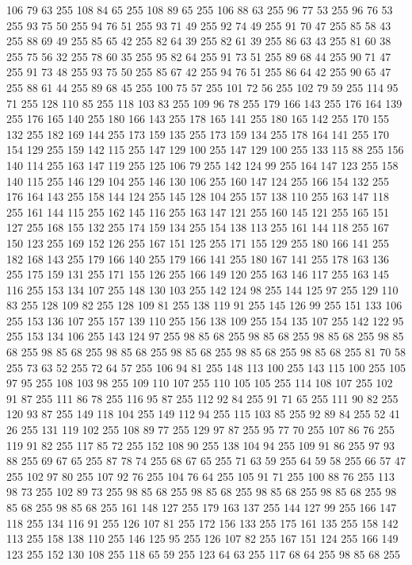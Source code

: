 106 79 63 255 108 84 65 255 108 89 65 255 106 88 63 255 96 77 53 255 96 76 53 255 93 75 50 255 94 76 51 255 93 71 49 255 92 74 49 255 91 70 47 255 85 58 43 255 88 69 49 255 85 65 42 255 82 64 39 255 82 61 39 255 86 63 43 255 81 60 38 255 75 56 32 255 78 60 35 255 95 82 64 255 91 73 51 255 89 68 44 255 90 71 47 255 91 73 48 255 93 75 50 255 85 67 42 255 94 76 51 255 86 64 42 255 90 65 47 255 88 61 44 255 89 68 45 255 100 75 57 255 101 72 56 255 102 79 59 255 114 95 71 255 128 110 85 255 118 103 83 255 109 96 78 255 179 166 143 255 176 164 139 255 176 165 140 255 180 166 143 255 178 165 141 255 180 165 142 255 170 155 132 255 182 169 144 255 173 159 135 255 173 159 134 255 178 164 141 255 170 154 129 255 159 142 115 255 147 129 100 255 147 129 100 255 133 115 88 255 156 140 114 255 163 147 119 255 125 106 79 255 142 124 99 255 164 147 123 255 158 140 115 255 146 129 104 255 146 130 106 255 160 147 124 255
166 154 132 255 176 164 143 255 158 144 124 255 145 128 104 255 157 138 110 255 163 147 118 255 161 144 115 255 162 145 116 255 163 147 121 255 160 145 121 255 165 151 127 255 168 155 132 255 174 159 134 255 154 138 113 255 161 144 118 255 167 150 123 255 169 152 126 255 167 151 125 255 171 155 129 255 180 166 141 255 182 168 143 255 179 166 140 255 179 166 141 255 180 167 141 255 178 163 136 255 175 159 131 255 171 155 126 255 166 149 120 255 163 146 117 255 163 145 116 255 153 134 107 255 148 130 103 255 142 124 98 255 144 125 97 255 129 110 83 255 128 109 82 255 128 109 81 255 138 119 91 255 145 126 99 255 151 133 106 255 153 136 107 255 157 139 110 255 156 138 109 255 154 135 107 255 142 122 95 255 153 134 106 255 143 124 97 255 98 85 68 255 98 85 68 255 98 85 68 255 98 85 68 255 98 85 68 255 98 85 68 255 98 85 68 255 98 85 68 255 98 85 68 255 81 70 58 255 73 63 52 255 72 64 57 255 106 94 81 255 148 113 100 255 143 115 100 255 105 97 95 255 108 103 98 255
109 110 107 255 110 105 105 255 114 108 107 255 102 91 87 255 111 86 78 255 116 95 87 255 112 92 84 255 91 71 65 255 111 90 82 255 120 93 87 255 149 118 104 255 149 112 94 255 115 103 85 255 92 89 84 255 52 41 26 255 131 119 102 255 108 89 77 255 129 97 87 255 95 77 70 255 107 86 76 255 119 91 82 255 117 85 72 255 152 108 90 255 138 104 94 255 109 91 86 255 97 93 88 255 69 67 65 255 87 78 74 255 68 67 65 255 71 63 59 255 64 59 58 255 66 57 47 255 102 97 80 255 107 92 76 255 104 76 64 255 105 91 71 255 100 88 76 255 113 98 73 255 102 89 73 255 98 85 68 255 98 85 68 255 98 85 68 255 98 85 68 255 98 85 68 255 98 85 68 255 161 148 127 255 179 163 137 255 144 127 99 255 166 147 118 255 134 116 91 255 126 107 81 255 172 156 133 255 175 161 135 255 158 142 113 255 158 138 110 255 146 125 95 255 126 107 82 255 167 151 124 255 166 149 123 255 152 130 108 255 118 65 59 255 123 64 63 255 117 68 64 255 98 85 68 255
